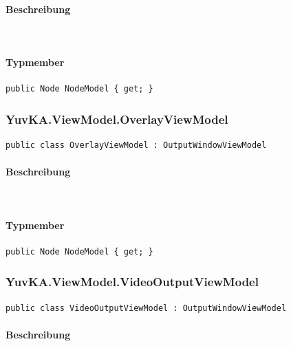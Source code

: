 \paragraph{Beschreibung}~\\

\paragraph{Typmember}
\begin{itemize}

	\begin{verbatim}
public Node NodeModel { get; }
	\end{verbatim}

\end{itemize}

\subsubsection{YuvKA.ViewModel.OverlayViewModel}

\begin{verbatim}
public class OverlayViewModel : OutputWindowViewModel
\end{verbatim}

\paragraph{Beschreibung}~\\

\paragraph{Typmember}
\begin{itemize}

	\begin{verbatim}
public Node NodeModel { get; }
	\end{verbatim}

\end{itemize}

\subsubsection{YuvKA.ViewModel.VideoOutputViewModel}

\begin{verbatim}
public class VideoOutputViewModel : OutputWindowViewModel
\end{verbatim}

\paragraph{Beschreibung}~\\
